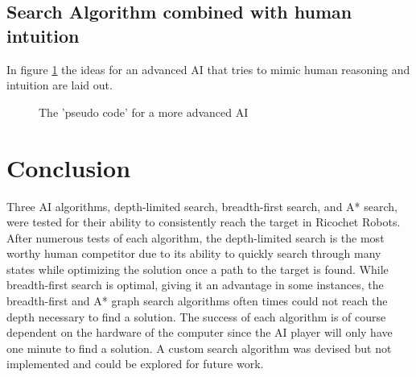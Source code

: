 \documentclass[a4paper,10pt]{article}
\begin{document}
  \subsection{Search Algorithm combined with human intuition}
  In figure \ref{fig:pseudo} the ideas for an advanced AI that tries to mimic human reasoning and intuition are laid out.
  \begin{figure}[!htb]
  \caption{The 'pseudo code' for a more advanced AI}
  \label{fig:pseudo}
  \end{figure}

\section{Conclusion}
Three AI algorithms, depth-limited search, breadth-first search, and A* search, were tested for their ability to consistently reach the target in Ricochet Robots. After numerous tests of each algorithm, the depth-limited search is the most worthy human competitor due to its ability to quickly search through many states while optimizing the solution once a path to the target is found. While breadth-first search is optimal, giving it an advantage in some instances, the breadth-first and A* graph search algorithms often times could not reach the depth necessary to find a solution. The success of each algorithm is of course dependent on the hardware of the computer since the AI player will only have one minute to find a solution. A custom search algorithm was devised but not implemented and could be explored for future work.


\end{document}
